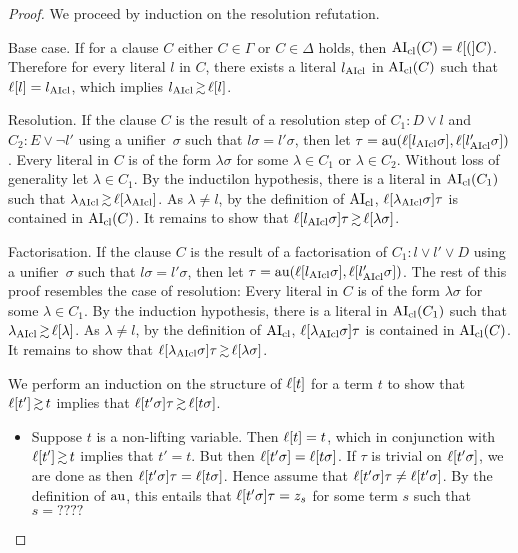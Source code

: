 \documentclass[,%
	draft=false,%
	numbers=noendperiod
	oneside,openany
	a4paper,
	11pt,
]{memoir}
\begin{document}
\begin{proof}
	We proceed by induction on the resolution refutation.
	\begin{description}
		\item{Base case.}
			If for a clause $C$ either $C\in \Gamma$ or $C \in \Delta$ holds, then $\operatorname{AI}_\mathrm{cl}(C) = \ell[(]C)$.
			Therefore for every literal $l$ in $C$, there exists a literal $l_{\operatorname{AIcl}}$ in $\operatorname{AI}_\mathrm{cl}(C)$ such that $\ell[l] = l_{\operatorname{AIcl}}$, which implies $l\cl \simgeq \lifboth{l}$.

		\item{Resolution.}
			If the clause $C$ is the result of a resolution step of $C_1: D \lor l$ and $C_2: E \lor \lnot l'$ using a unifier~$\sigma$ such that $l\sigma = l'\sigma$,
			then let $\tau = \operatorname{au}(\ell[l_{\operatorname{AIcl}}\sigma], \ell[l'_{\operatorname{AIcl}}\sigma])$.
			Every literal in $C$ is of the form $\lambda\sigma$ for some $\lambda \in C_1$ or $\lambda \in C_2$. Without loss of generality let $\lambda \in C_1$.
			By the inductilon hypothesis, there is a literal in $\operatorname{AI}_\mathrm{cl}(C_1)$ such that $\lambda\cl \simgeq \lifboth{\lambda\cl}$.
			As $\lambda \neq l$, by the definition of $\operatorname{AI}_\mathrm{cl}$, $\ell[\lambda_{\operatorname{AIcl}}\sigma]\tau$ is contained in $\operatorname{AI}_\mathrm{cl}(C)$.
			It remains to show that $\lifboth{l\cl\sigma}\tau \simgeq \lifboth{\lambda\sigma}$.

		\item{Factorisation.}
			If the clause $C$ is the result of a factorisation of $C_1: l \lor l' \lor D$ using a unifier~$\sigma$ such that $l\sigma = l'\sigma$, then let $\tau = \operatorname{au}(\ell[l_{\operatorname{AIcl}}\sigma], \ell[l'_{\operatorname{AIcl}}\sigma])$.
			The rest of this proof resembles the case of resolution:
			Every literal in $C$ is of the form $\lambda\sigma$ for some $\lambda \in C_1$.
			By the induction hypothesis, there is a literal in $\operatorname{AI}_\mathrm{cl}(C_1)$ such that $\lambda\cl \simgeq \lifboth{\lambda}$.
			As $\lambda \neq l$, by the definition of $\operatorname{AI}_\mathrm{cl}$, $\ell[\lambda_{\operatorname{AIcl}}\sigma]\tau$ is contained in $\operatorname{AI}_\mathrm{cl}(C)$.
			It remains to show that $\lifboth{\lambda\cl\sigma}\tau \simgeq \lifboth{\lambda\sigma}$.

	\end{description}


We perform an induction on the structure of $\ell[t]$ for a term $t$ to show that $\lifboth{t'} \simgeq t$ implies that $\lifboth{t'\sigma}\tau \simgeq \lifboth{t\sigma}$.
	\begin{itemize}
		\item{ Suppose $t$ is a non-lifting variable. }
			Then $\ell[t] = t$, which in conjunction with $\lifboth{t'} \simgeq t$ implies that $t'=t$.
			But then $\ell[t'\sigma] = \ell[t\sigma]$.
			If $\tau$ is trivial on $\ell[t'\sigma]$, we are done as then $\ell[t'\sigma]\tau = \ell[t\sigma]$.
			Hence assume that $\ell[t'\sigma]\tau \neq \ell[t'\sigma]$.
			By the definition of $\operatorname{au}$, this entails that $\ell[t'\sigma]\tau = z_s$ for some term $s$ such that $s = ????$
	\end{itemize}

\end{proof}
\end{document}
